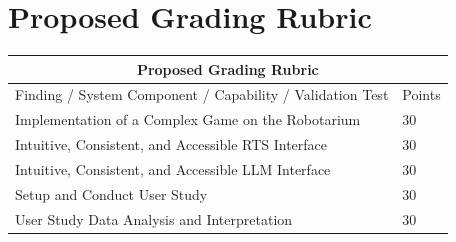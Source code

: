 \section{Proposed Grading Rubric}

\begin{tabular}{ |p{12cm}||p{3cm}| }
 \hline
 \multicolumn{2}{|c|}{Proposed Grading Rubric} \\
 \hline
 Finding / System Component / Capability / Validation Test & Points\\
 \hline
 Implementation of a Complex Game on the Robotarium & 30 \\
 Intuitive, Consistent, and Accessible RTS Interface & 30 \\
 Intuitive, Consistent, and Accessible LLM Interface & 30 \\
 Setup and Conduct User Study & 30 \\
 User Study Data Analysis and Interpretation & 30 \\
 \hline
\end{tabular}